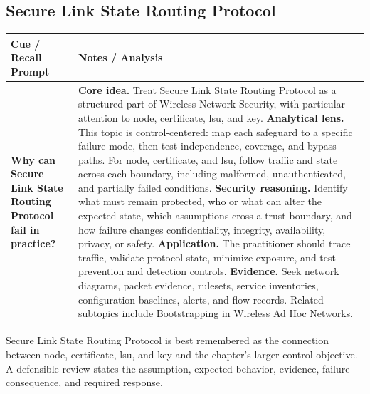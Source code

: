 \documentclass[11pt]{article}
\newcommand{\CornellHeader}{%
\rowcolor{Navy}\color{white}\bfseries Cue / Recall Prompt & \color{white}\bfseries Notes / Analysis\\\hline}
\newcommand{\CornellRow}[2]{%
\cellcolor{CueGray}\RaggedRight\textbf{#1} & \RaggedRight #2\\\hline}
\begin{document}
\subsection*{Secure Link State Routing Protocol}
\begin{longtable}{>{\RaggedRight\arraybackslash}p{}|>{\RaggedRight\arraybackslash}p{}}
\CornellHeader
\CornellRow{Why can Secure Link State Routing Protocol fail in practice?}{\textbf{Core idea.} Treat Secure Link State Routing Protocol as a structured part of Wireless Network Security, with particular attention to node, certificate, lsu, and key. \textbf{Analytical lens.} This topic is control-centered: map each safeguard to a specific failure mode, then test independence, coverage, and bypass paths. For node, certificate, and lsu, follow traffic and state across each boundary, including malformed, unauthenticated, and partially failed conditions. \textbf{Security reasoning.} Identify what must remain protected, who or what can alter the expected state, which assumptions cross a trust boundary, and how failure changes confidentiality, integrity, availability, privacy, or safety. \textbf{Application.} The practitioner should trace traffic, validate protocol state, minimize exposure, and test prevention and detection controls. \textbf{Evidence.} Seek network diagrams, packet evidence, rulesets, service inventories, configuration baselines, alerts, and flow records. Related subtopics include Bootstrapping in Wireless Ad Hoc Networks.}
\end{longtable}
\begin{topicsummary}
Secure Link State Routing Protocol is best remembered as the connection between node, certificate, lsu, and key and the chapter's larger control objective. A defensible review states the assumption, expected behavior, evidence, failure consequence, and required response.
\end{topicsummary}
\end{document}

